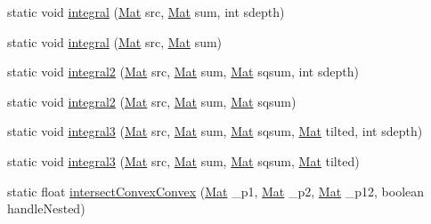 \begin{DoxyCompactItemize}
\item 
static void \mbox{\hyperlink{classorg_1_1opencv_1_1imgproc_1_1_imgproc_a44841cd68ca7d5aeba8b98f886a3f8c9}{integral}} (\mbox{\hyperlink{classorg_1_1opencv_1_1core_1_1_mat}{Mat}} src, \mbox{\hyperlink{classorg_1_1opencv_1_1core_1_1_mat}{Mat}} sum, int sdepth)
\item 
static void \mbox{\hyperlink{classorg_1_1opencv_1_1imgproc_1_1_imgproc_af1ddaebf0a329d81acc73b949d229c14}{integral}} (\mbox{\hyperlink{classorg_1_1opencv_1_1core_1_1_mat}{Mat}} src, \mbox{\hyperlink{classorg_1_1opencv_1_1core_1_1_mat}{Mat}} sum)
\item 
static void \mbox{\hyperlink{classorg_1_1opencv_1_1imgproc_1_1_imgproc_a9df7bb343fe42a9a1fc27e46ec4c54fe}{integral2}} (\mbox{\hyperlink{classorg_1_1opencv_1_1core_1_1_mat}{Mat}} src, \mbox{\hyperlink{classorg_1_1opencv_1_1core_1_1_mat}{Mat}} sum, \mbox{\hyperlink{classorg_1_1opencv_1_1core_1_1_mat}{Mat}} sqsum, int sdepth)
\item 
static void \mbox{\hyperlink{classorg_1_1opencv_1_1imgproc_1_1_imgproc_a568b82028d35989917fbd0eefb3aaee5}{integral2}} (\mbox{\hyperlink{classorg_1_1opencv_1_1core_1_1_mat}{Mat}} src, \mbox{\hyperlink{classorg_1_1opencv_1_1core_1_1_mat}{Mat}} sum, \mbox{\hyperlink{classorg_1_1opencv_1_1core_1_1_mat}{Mat}} sqsum)
\item 
static void \mbox{\hyperlink{classorg_1_1opencv_1_1imgproc_1_1_imgproc_a4e6458cea7a26ba5d93f259aa4270553}{integral3}} (\mbox{\hyperlink{classorg_1_1opencv_1_1core_1_1_mat}{Mat}} src, \mbox{\hyperlink{classorg_1_1opencv_1_1core_1_1_mat}{Mat}} sum, \mbox{\hyperlink{classorg_1_1opencv_1_1core_1_1_mat}{Mat}} sqsum, \mbox{\hyperlink{classorg_1_1opencv_1_1core_1_1_mat}{Mat}} tilted, int sdepth)
\item 
static void \mbox{\hyperlink{classorg_1_1opencv_1_1imgproc_1_1_imgproc_aa4e01b9d9963a4f5be66b8a71c742094}{integral3}} (\mbox{\hyperlink{classorg_1_1opencv_1_1core_1_1_mat}{Mat}} src, \mbox{\hyperlink{classorg_1_1opencv_1_1core_1_1_mat}{Mat}} sum, \mbox{\hyperlink{classorg_1_1opencv_1_1core_1_1_mat}{Mat}} sqsum, \mbox{\hyperlink{classorg_1_1opencv_1_1core_1_1_mat}{Mat}} tilted)
\item 
static float \mbox{\hyperlink{classorg_1_1opencv_1_1imgproc_1_1_imgproc_a69e8aafe58e0ea526c3efca2a41542da}{intersect\+Convex\+Convex}} (\mbox{\hyperlink{classorg_1_1opencv_1_1core_1_1_mat}{Mat}} \+\_\+p1, \mbox{\hyperlink{classorg_1_1opencv_1_1core_1_1_mat}{Mat}} \+\_\+p2, \mbox{\hyperlink{classorg_1_1opencv_1_1core_1_1_mat}{Mat}} \+\_\+p12, boolean handle\+Nested)

\end{DoxyCompactItemize}
